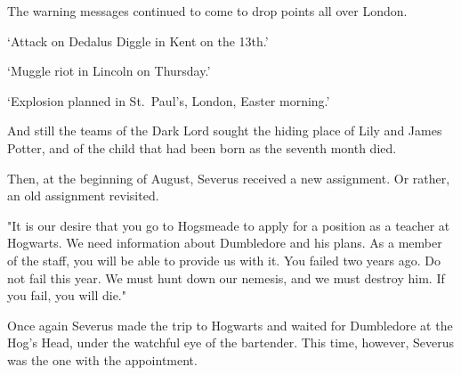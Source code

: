 The warning messages continued to come to drop points all over London.

`Attack on Dedalus Diggle in Kent on the 13th.'

`Muggle riot in Lincoln on Thursday.'

`Explosion planned in St.~Paul's, London, Easter morning.'

And still the teams of the Dark Lord sought the hiding place of Lily and James Potter, and of the child that had been born as the seventh month died.

Then, at the beginning of August, Severus received a new assignment. Or rather, an old assignment revisited.

"It is our desire that you go to Hogsmeade to apply for a position as a teacher at Hogwarts. We need information about Dumbledore and his plans. As a member of the staff, you will be able to provide us with it. You failed two years ago. Do not fail this year. We must hunt down our nemesis, and we must destroy him. If you fail, you will die."

Once again Severus made the trip to Hogwarts and waited for Dumbledore at the Hog's Head, under the watchful eye of the bartender. This time, however, Severus was the one with the appointment.




